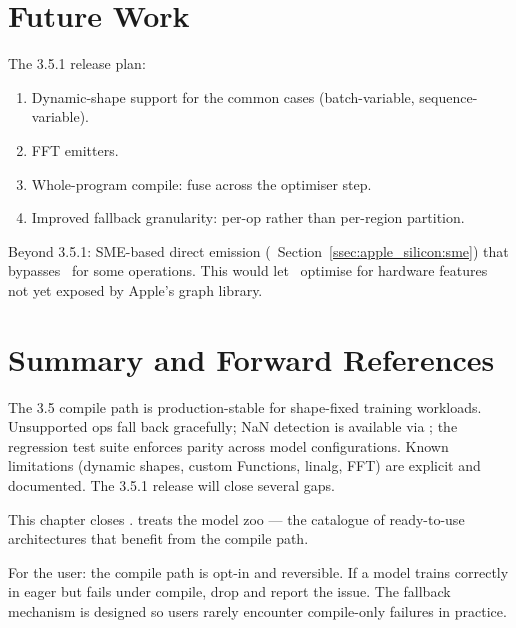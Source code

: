 \section{Future Work}
\label{sec:compile_hardening:future_work}

The 3.5.1 release plan:

\begin{enumerate}
  \item Dynamic-shape support for the common cases
    (batch-variable, sequence-variable).
  \item FFT emitters.
  \item Whole-program compile: fuse across the optimiser step.
  \item Improved fallback granularity: per-op rather than
    per-region partition.
\end{enumerate}

Beyond 3.5.1: SME-based direct emission
(~Section~\ref{ssec:apple_silicon:sme})
that bypasses \MPSGraph\ for some operations. This would let
\Lucid\ optimise for hardware features not yet exposed by Apple's
graph library.

\section{Summary and Forward References}
\label{sec:compile_hardening:summary}

The 3.5 compile path is production-stable for shape-fixed
training workloads. Unsupported ops fall back gracefully; NaN
detection is available via ; the regression
test suite enforces parity across model configurations. Known
limitations (dynamic shapes, custom Functions, linalg, FFT)
are explicit and documented. The 3.5.1 release will close
several gaps.

This chapter closes .
 treats the model zoo --- the catalogue
of ready-to-use architectures that benefit from the compile
path.

\begin{lucidnote}
For the user: the compile path is opt-in and reversible. If a
model trains correctly in eager but fails under compile, drop
 and report the issue. The fallback
mechanism is designed so users rarely encounter compile-only
failures in practice.
\end{lucidnote}
